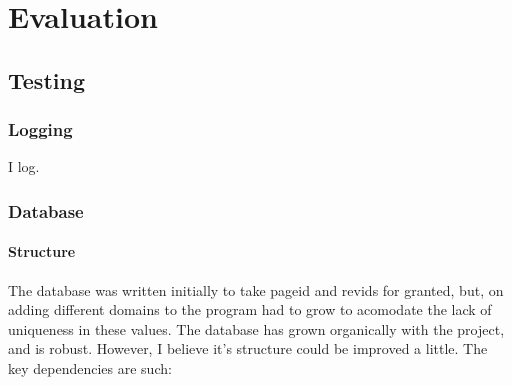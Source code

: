 \chapter{Evaluation}

\section{Testing}

\subsection{Logging}

I log.

\subsection{Database}

\subsubsection*{Structure}

The database was written initially to take pageid and revids for
granted, but, on adding different domains to the program had to grow
to acomodate the lack of uniqueness in these values. The database has
grown organically with the project, and is robust. However, I believe
it's structure could be improved a little. The key dependencies are such: 


